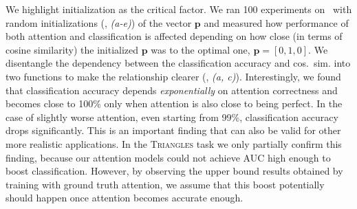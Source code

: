 We highlight initialization as the critical factor. We ran 100 experiments on ~with random initializations (\fig{\ref{fig:accuracy_cos_sim}}, \textit{(a-e)}) of the vector $\mathbf{p}$ and measured how performance of both attention and classification is affected depending on how close (in terms of cosine similarity) the initialized $\mathbf{p}$ was to the optimal one, $\mathbf{p} = [0,1,0]$.
We disentangle the dependency between the classification accuracy and cos.~sim. into two functions to make the relationship clearer (\fig{\ref{fig:accuracy_cos_sim}}, \textit{(a, c)}).
Interestingly, we found that classification accuracy depends \textit{exponentially} on attention correctness and becomes close to 100\% only when attention is also close to being perfect. In the case of slightly worse attention, even starting from 99\%, classification accuracy drops significantly.
This is an important finding that can also be valid for other more realistic applications. In the \textsc{Triangles} task we only partially confirm this finding, because our attention models could not achieve AUC high enough to boost classification. However, by observing the upper bound results obtained by training with ground truth attention, we assume that this boost potentially should happen once attention becomes accurate enough.

